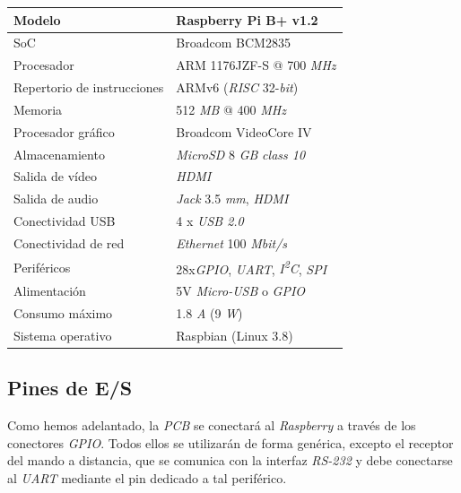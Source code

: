 \begin{center}
	\begin{tabular}{|l|l|}
		\hline Modelo & Raspberry Pi B+ v1.2 \\
		\hline SoC & Broadcom BCM2835 \\
		\hline Procesador & ARM 1176JZF-S @ 700 \textit{MHz} \\
		\hline Repertorio de instrucciones & ARMv6 (\textit{RISC} 32-\textit{bit}) \\
		\hline Memoria & 512 \textit{MB} @ 400 \textit{MHz} \\
		\hline Procesador gráfico & Broadcom VideoCore IV \\ 		
		\hline Almacenamiento & \textit{MicroSD} 8 \textit{GB} \textit{class 10} \\
		\hline Salida de vídeo & \textit{HDMI} \\
		\hline Salida de audio & \textit{Jack} 3.5 \textit{mm}, \textit{HDMI} \\
		\hline Conectividad USB & 4 x \textit{USB 2.0} \\
		\hline Conectividad de red & \textit{Ethernet} 100 \textit{Mbit/s} \\
		\hline Periféricos & 28x\textit{GPIO}, \textit{UART}, \textit{I\textsuperscript{2}C}, \textit{SPI} \\ 
		\hline Alimentación & 5V \textit{Micro-USB} o \textit{GPIO} \\
		\hline Consumo máximo & 1.8 \textit{A} (9 \textit{W}) \\ 
		\hline Sistema operativo & Raspbian (Linux 3.8) \\
		\hline 
	\end{tabular}
	\smallskip

\end{center}

\smallskip

\subsection{Pines de E/S}

Como hemos adelantado, la \textit{PCB} se conectará al \textit{Raspberry} a través de los conectores \textit{GPIO}. Todos ellos se utilizarán de forma genérica, excepto el receptor del mando a distancia, que se comunica con la interfaz \textit{RS-232} y debe conectarse al \textit{UART} mediante el pin dedicado a tal periférico.

